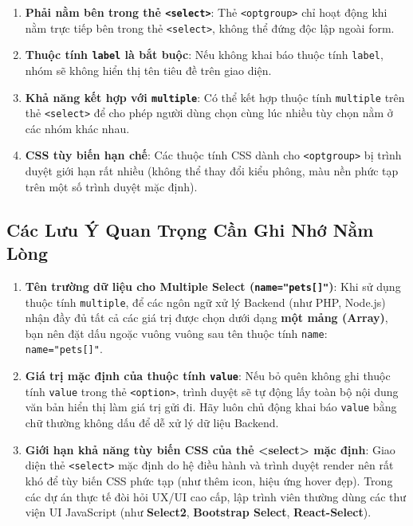 \documentclass[11pt,oneside]{book}
\newcommand{\codeinline}[1]{\textcolor{accentOrange}{\texttt{#1}}}
\newcommand{\term}[1]{\textbf{\textcolor{primaryBlue}{#1}}}
\begin{document}
\begin{warnBox}
\begin{enumerate}[leftmargin=1.5em, itemsep=4pt, parsep=0pt]
    \item \textbf{Phải nằm bên trong thẻ \codeinline{<select>}}: Thẻ \codeinline{<optgroup>} chỉ hoạt động khi nằm trực tiếp bên trong thẻ \codeinline{<select>}, không thể đứng độc lập ngoài form.
    \item \textbf{Thuộc tính \codeinline{label} là bắt buộc}: Nếu không khai báo thuộc tính \codeinline{label}, nhóm sẽ không hiển thị tên tiêu đề trên giao diện.
    \item \textbf{Khả năng kết hợp với \codeinline{multiple}}: Có thể kết hợp thuộc tính \codeinline{multiple} trên thẻ \codeinline{<select>} để cho phép người dùng chọn cùng lúc nhiều tùy chọn nằm ở các nhóm khác nhau.
    \item \textbf{CSS tùy biến hạn chế}: Các thuộc tính CSS dành cho \codeinline{<optgroup>} bị trình duyệt giới hạn rất nhiều (không thể thay đổi kiểu phông, màu nền phức tạp trên một số trình duyệt mặc định).
\end{enumerate}
\end{warnBox}

\subsection{Các Lưu Ý Quan Trọng Cần Ghi Nhớ Nằm Lòng}

\begin{warnBox}
\begin{enumerate}[leftmargin=1.5em, itemsep=6pt, parsep=0pt]
    \item \textbf{Tên trường dữ liệu cho Multiple Select (\codeinline{name="pets[]"})}:
    Khi sử dụng thuộc tính \codeinline{multiple}, để các ngôn ngữ xử lý Backend (như PHP, Node.js) nhận đầy đủ tất cả các giá trị được chọn dưới dạng \textbf{một mảng (Array)}, bạn nên đặt dấu ngoặc vuông vuông sau tên thuộc tính \codeinline{name}: \codeinline{name="pets[]"}.

    \item \textbf{Giá trị mặc định của thuộc tính \codeinline{value}}:
    Nếu bỏ quên không ghi thuộc tính \codeinline{value} trong thẻ \codeinline{<option>}, trình duyệt sẽ tự động lấy toàn bộ nội dung văn bản hiển thị làm giá trị gửi đi. Hãy luôn chủ động khai báo \codeinline{value} bằng chữ thường không dấu để dễ xử lý dữ liệu Backend.

    \item \textbf{Giới hạn khả năng tùy biến CSS của thẻ <select> mặc định}:
    Giao diện thẻ \codeinline{<select>} mặc định do hệ điều hành và trình duyệt render nên rất khó để tùy biến CSS phức tạp (như thêm icon, hiệu ứng hover đẹp). Trong các dự án thực tế đòi hỏi UX/UI cao cấp, lập trình viên thường dùng các thư viện UI JavaScript (như \term{Select2}, \term{Bootstrap Select}, \term{React-Select}).
\end{enumerate}
\end{warnBox}
\end{document}
